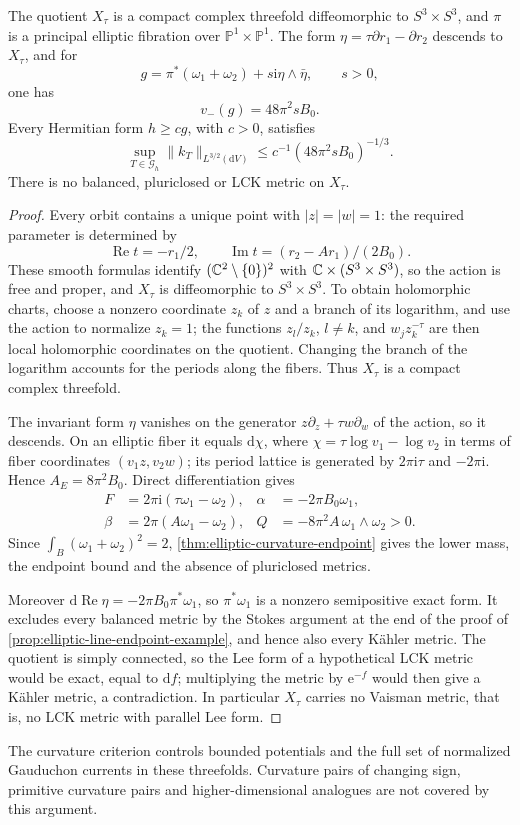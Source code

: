 \begin{proposition}\label{prop:calabi-eckmann-endpoint}
The quotient $X_\tau$ is a compact complex threefold diffeomorphic to $S^3\times S^3$, and $\pi$ is a principal elliptic fibration over $\mathbb P^1\times\mathbb P^1$. The form $\eta=\tau\partial r_1-\partial r_2$ descends to $X_\tau$, and for
\[
 g=\pi^*(\omega_1+\omega_2)+s\mathrm i\eta\wedge\bar\eta,
 \qquad s>0,
\]
one has
\begin{equation}\label{eq:calabi-eckmann-lower-mass}
 v_-(g)=48\pi^2sB_0.
\end{equation}
Every Hermitian form $h\geq c g$, with $c>0$, satisfies
\[
 \sup_{T\in\mathscr G_h}\|k_T\|_{L^{3/2}(\mathrm dV)}
 \leq c^{-1}(48\pi^2sB_0)^{-1/3}.
\]
There is no balanced, pluriclosed or LCK metric on $X_\tau$.
\end{proposition}
\begin{proof}
Every orbit contains a unique point with $|z|=|w|=1$: the required parameter is determined by
\[
 \operatorname{Re}t=-r_1/2,\qquad
 \operatorname{Im}t=(r_2-Ar_1)/(2B_0).
\]
These smooth formulas identify $(\mathbb C^2\setminus\{0\})^2$ with $\mathbb C\times(S^3\times S^3)$, so the action is free and proper, and $X_\tau$ is diffeomorphic to $S^3\times S^3$. To obtain holomorphic charts, choose a nonzero coordinate $z_k$ of $z$ and a branch of its logarithm, and use the action to normalize $z_k=1$; the functions $z_l/z_k$, $l\ne k$, and $w_jz_k^{-\tau}$ are then local holomorphic coordinates on the quotient. Changing the branch of the logarithm accounts for the periods along the fibers. Thus $X_\tau$ is a compact complex threefold.

The invariant form $\eta$ vanishes on the generator $z\partial_z+\tau w\partial_w$ of the action, so it descends. On an elliptic fiber it equals $\mathrm d\chi$, where $\chi=\tau\log v_1-\log v_2$ in terms of fiber coordinates $(v_1z,v_2w)$; its period lattice is generated by $2\pi\mathrm i\tau$ and $-2\pi\mathrm i$. Hence $A_E=8\pi^2B_0$. Direct differentiation gives
\[
 \begin{aligned}
 F&=2\pi\mathrm i(\tau\omega_1-\omega_2),&
 \alpha&=-2\pi B_0\omega_1,\\
 \beta&=2\pi(A\omega_1-\omega_2),&
 Q&=-8\pi^2A\,\omega_1\wedge\omega_2>0.
 \end{aligned}
\]
Since $\int_B(\omega_1+\omega_2)^2=2$, \cref{thm:elliptic-curvature-endpoint} gives the lower mass, the endpoint bound and the absence of pluriclosed metrics.

Moreover $\mathrm d\operatorname{Re}\eta=-2\pi B_0\pi^*\omega_1$, so $\pi^*\omega_1$ is a nonzero semipositive exact form. It excludes every balanced metric by the Stokes argument at the end of the proof of \cref{prop:elliptic-line-endpoint-example}, and hence also every K\"ahler metric. The quotient is simply connected, so the Lee form of a hypothetical LCK metric would be exact, equal to $\mathrm df$; multiplying the metric by $\mathrm e^{-f}$ would then give a K\"ahler metric, a contradiction. In particular $X_\tau$ carries no Vaisman metric, that is, no LCK metric with parallel Lee form.
\end{proof}

The curvature criterion controls bounded potentials and the full set of normalized Gauduchon currents in these threefolds. Curvature pairs of changing sign, primitive curvature pairs and higher-dimensional analogues are not covered by this argument.

